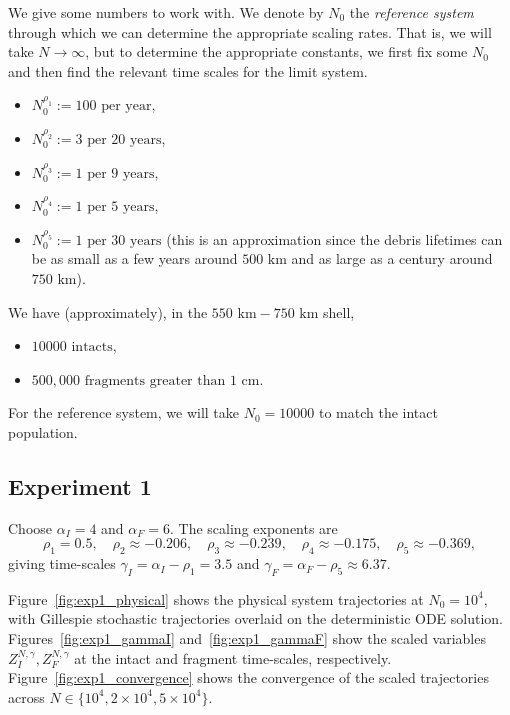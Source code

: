 \documentclass{article}
\begin{document}
We give some numbers to work with.
We denote by $N_0$ the \emph{reference system} through which we can determine the appropriate scaling rates.
That is, we will take $N \to \infty$, but to determine the appropriate constants, we first fix some $N_0$ and then find the relevant time scales for the limit system.

\begin{itemize}
    \item $N_0^{\rho_1} := 100 \text{ per year}$,
    \item $N_0^{\rho_2} := 3 \text{ per 20 years}$,
    \item $N_0^{\rho_3} := 1 \text{ per 9 years}$,
    \item $N_0^{\rho_4} := 1 \text{ per 5 years}$,
    \item $N_0^{\rho_5} := 1 \text{ per 30 years}$ (this is an approximation since the debris lifetimes can be as small as a few years around $500 \text{ km}$ and as large as a century around $750 \text{ km}$).
\end{itemize}

We have (approximately), in the $550 \text{ km} - 750\text{ km}$ shell, 
\begin{itemize}
    \item $10000 \text{ intacts}$,
    \item $500,000 \text{ fragments greater than $1$ cm}$.
\end{itemize}
For the reference system, we will take $N_0 = 10000$ to match the intact population.

\subsection{Experiment 1}
Choose $\alpha_I = 4$ and $\alpha_F = 6$.
The scaling exponents are
\[\rho_1 = 0.5, \quad \rho_2 \approx -0.206, \quad \rho_3 \approx -0.239, \quad \rho_4 \approx -0.175, \quad \rho_5 \approx -0.369,\]
giving time-scales $\gamma_I = \alpha_I - \rho_1 = 3.5$ and $\gamma_F = \alpha_F - \rho_5 \approx 6.37$.

Figure~\ref{fig:exp1_physical} shows the physical system trajectories at $N_0 = 10^4$, with Gillespie stochastic trajectories overlaid on the deterministic ODE solution.
Figures~\ref{fig:exp1_gammaI} and~\ref{fig:exp1_gammaF} show the scaled variables $Z_I^{N,\gamma}, Z_F^{N,\gamma}$ at the intact and fragment time-scales, respectively.
Figure~\ref{fig:exp1_convergence} shows the convergence of the scaled trajectories across $N \in \{10^4, 2\times 10^4, 5\times 10^4\}$.
\end{document}
